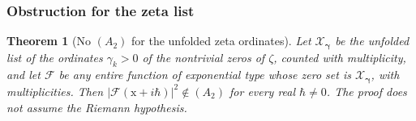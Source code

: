 \documentclass[11pt,reqno]{amsart}
\numberwithin{equation}{section}
\theoremstyle{plain}
\newtheorem{theorem}{Theorem}[section]
\theoremstyle{definition}
\theoremstyle{remark}
\begin{document}
\subsubsection{Obstruction for the zeta list}\label{subsec:rb-obstruction}

\begin{theorem}[No $(A_2)$ for the unfolded zeta ordinates]\label{thm:rb-obstruction}
Let $\mathscr X_{\boldsymbol\gamma}$ be the unfolded list of the ordinates $\gamma_k>0$ of the nontrivial zeros of $\zeta$, counted with multiplicity, and let $\mathcal F$ be any entire function of exponential type whose zero set is $\mathscr X_{\boldsymbol\gamma}$, with multiplicities. Then $|\mathcal F(\mathrm x+i\hbar)|^2\notin(A_2)$ for every real $\hbar\ne0$. The proof does not assume the Riemann hypothesis.
\end{theorem}
\end{document}
